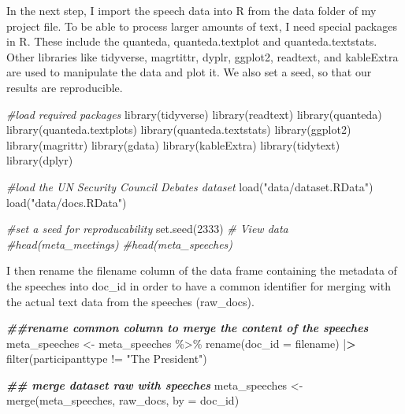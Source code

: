 \documentclass[
]{article}
\newenvironment{Shaded}{\begin{snugshade}}{\end{snugshade}}
\newcommand{\AttributeTok}[1]{\textcolor[rgb]{0.77,0.63,0.00}{#1}}
\newcommand{\CommentTok}[1]{\textcolor[rgb]{0.56,0.35,0.01}{\textit{#1}}}
\newcommand{\DecValTok}[1]{\textcolor[rgb]{0.00,0.00,0.81}{#1}}
\newcommand{\DocumentationTok}[1]{\textcolor[rgb]{0.56,0.35,0.01}{\textbf{\textit{#1}}}}
\newcommand{\ErrorTok}[1]{\textcolor[rgb]{0.64,0.00,0.00}{\textbf{#1}}}
\newcommand{\FunctionTok}[1]{\textcolor[rgb]{0.00,0.00,0.00}{#1}}
\newcommand{\NormalTok}[1]{#1}
\newcommand{\OtherTok}[1]{\textcolor[rgb]{0.56,0.35,0.01}{#1}}
\newcommand{\SpecialCharTok}[1]{\textcolor[rgb]{0.00,0.00,0.00}{#1}}
\newcommand{\StringTok}[1]{\textcolor[rgb]{0.31,0.60,0.02}{#1}}
\begin{document}
In the next step, I import the speech data into R from the data folder
of my project file. To be able to process larger amounts of text, I need
special packages in R. These include the quanteda, quanteda.textplot and
quanteda.textstats. Other libraries like tidyverse, magrtittr, dyplr,
ggplot2, readtext, and kableExtra are used to manipulate the data and
plot it. We also set a seed, so that our results are reproducible.

\begin{Shaded}
\begin{Highlighting}[]
\CommentTok{\#load required packages}
\FunctionTok{library}\NormalTok{(tidyverse)}
\FunctionTok{library}\NormalTok{(readtext)}
\FunctionTok{library}\NormalTok{(quanteda)}
\FunctionTok{library}\NormalTok{(quanteda.textplots)}
\FunctionTok{library}\NormalTok{(quanteda.textstats)}
\FunctionTok{library}\NormalTok{(ggplot2)}
\FunctionTok{library}\NormalTok{(magrittr)}
\FunctionTok{library}\NormalTok{(gdata)}
\FunctionTok{library}\NormalTok{(kableExtra)}
\FunctionTok{library}\NormalTok{(tidytext)}
\FunctionTok{library}\NormalTok{(dplyr)}

\CommentTok{\#load the UN Security Council Debates dataset}
\FunctionTok{load}\NormalTok{(}\StringTok{"data/dataset.RData"}\NormalTok{)}
\FunctionTok{load}\NormalTok{(}\StringTok{"data/docs.RData"}\NormalTok{)}

\CommentTok{\#set a seed for reproducability}
\FunctionTok{set.seed}\NormalTok{(}\DecValTok{2333}\NormalTok{)}
\CommentTok{\# View data}
\CommentTok{\#head(meta\_meetings)}
\CommentTok{\#head(meta\_speeches)}
\end{Highlighting}
\end{Shaded}

I then rename the filename column of the data frame containing the
metadata of the speeches into doc\_id in order to have a common
identifier for merging with the actual text data from the speeches
(raw\_docs).

\begin{Shaded}
\begin{Highlighting}[]
\DocumentationTok{\#\#rename common column to merge the content of the speeches}
\NormalTok{meta\_speeches }\OtherTok{\textless{}{-}}\NormalTok{ meta\_speeches }\SpecialCharTok{\%\textgreater{}\%}
  \FunctionTok{rename}\NormalTok{(}\AttributeTok{doc\_id =}\NormalTok{ filename) }\SpecialCharTok{|}\ErrorTok{\textgreater{}} 
   \FunctionTok{filter}\NormalTok{(participanttype }\SpecialCharTok{!=} \StringTok{"The President"}\NormalTok{)}

\DocumentationTok{\#\# merge dataset raw with speeches}
\NormalTok{meta\_speeches }\OtherTok{\textless{}{-}} \FunctionTok{merge}\NormalTok{(meta\_speeches, raw\_docs, }\AttributeTok{by =} \StringTok{\textquotesingle{}doc\_id\textquotesingle{}}\NormalTok{)}
\end{Highlighting}
\end{Shaded}
\end{document}
